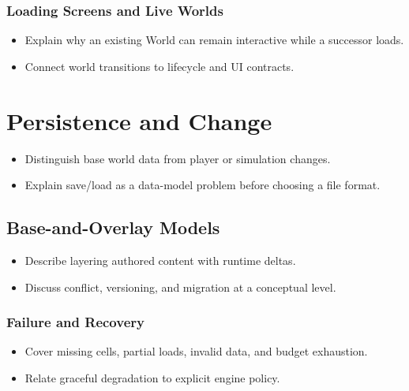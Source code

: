 \documentclass[
  11pt,
  letterpaper,
  DIV=11,
  numbers=noendperiod,
  twoside,
  open=right]{scrreprt}
\providecommand{\tightlist}{%
  \setlength{\itemsep}{0pt}\setlength{\parskip}{0pt}}
\begin{document}
\subsubsection{Loading Screens and Live
Worlds}\label{loading-screens-and-live-worlds}

\begin{itemize}
\tightlist
\item
  Explain why an existing World can remain interactive while a successor
  loads.
\item
  Connect world transitions to lifecycle and UI contracts.
\end{itemize}

\section{Persistence and Change}\label{persistence-and-change}

\begin{itemize}
\tightlist
\item
  Distinguish base world data from player or simulation changes.
\item
  Explain save/load as a data-model problem before choosing a file
  format.
\end{itemize}

\subsection{Base-and-Overlay Models}\label{base-and-overlay-models}

\begin{itemize}
\tightlist
\item
  Describe layering authored content with runtime deltas.
\item
  Discuss conflict, versioning, and migration at a conceptual level.
\end{itemize}

\subsubsection{Failure and Recovery}\label{failure-and-recovery}

\begin{itemize}
\tightlist
\item
  Cover missing cells, partial loads, invalid data, and budget
  exhaustion.
\item
  Relate graceful degradation to explicit engine policy.
\end{itemize}
\end{document}
